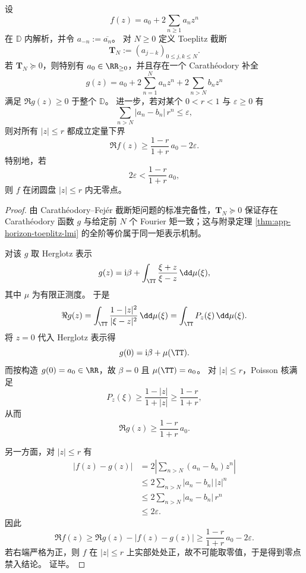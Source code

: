 \begin{theorem}\label{thm:xi-toeplitz-caratheodory-completion-tail-exclusion}
设
\[
f(z)=a_0+2\sum_{n\ge 1}a_n z^n
\]
在 \(\mathbb D\) 内解析，并令 \(a_{-n}:=\overline{a_n}\)。
对 \(N\ge 0\) 定义 Toeplitz 截断
\[
\mathbf T_N:=(a_{j-k})_{0\le j,k\le N}.
\]
若 \(\mathbf T_N\succeq 0\)，则特别有 \(a_0\in\RR_{\ge 0}\)，并且存在一个 Carath\'eodory 补全
\[
g(z)=a_0+2\sum_{n=1}^{N}a_n z^n+2\sum_{n>N}b_n z^n
\]
满足 \(\Re g(z)\ge 0\) 于整个 \(\mathbb D\)。
进一步，若对某个 \(0<r<1\) 与 \(\varepsilon\ge 0\) 有
\[
\sum_{n>N}|a_n-b_n|\,r^n\le \varepsilon,
\]
则对所有 \(|z|\le r\) 都成立定量下界
\[
\boxed{\;
\Re f(z)\ge
\frac{1-r}{1+r}\,a_0-2\varepsilon.\;}
\]
特别地，若
\[
2\varepsilon<\frac{1-r}{1+r}\,a_0,
\]
则 \(f\) 在闭圆盘 \(|z|\le r\) 内无零点。
\end{theorem}
\begin{proof}
由 Carath\'eodory--Fej\'er 截断矩问题的标准完备性，\(\mathbf T_N\succeq 0\) 保证存在 Carath\'eodory 函数 \(g\) 与给定前 \(N\) 个 Fourier 矩一致；这与附录定理 \ref{thm:app-horizon-toeplitz-lmi} 的全阶等价属于同一矩表示机制。
\par
对该 \(g\) 取 Herglotz 表示
\[
g(z)=\mathrm{i}\beta+\int_{\TT}\frac{\xi+z}{\xi-z}\,\dd\mu(\xi),
\]
其中 \(\mu\) 为有限正测度。
于是
\[
\Re g(z)=\int_{\TT}\frac{1-|z|^2}{|\xi-z|^2}\,\dd\mu(\xi)
=\int_{\TT}P_z(\xi)\,\dd\mu(\xi).
\]
将 \(z=0\) 代入 Herglotz 表示得
\[
g(0)=\mathrm{i}\beta+\mu(\TT).
\]
而按构造 \(g(0)=a_0\in\RR\)，故 \(\beta=0\) 且 \(\mu(\TT)=a_0\)。
对 \(|z|\le r\)，Poisson 核满足
\[
P_z(\xi)\ge \frac{1-|z|}{1+|z|}\ge \frac{1-r}{1+r},
\]
从而
\[
\Re g(z)\ge \frac{1-r}{1+r}\,a_0.
\]
\par
另一方面，对 \(|z|\le r\) 有
\[
\begin{aligned}
|f(z)-g(z)|
&=
2\left|
\sum_{n>N}(a_n-b_n)z^n
\right|\\
&\le
2\sum_{n>N}|a_n-b_n|\,|z|^n\\
&\le
2\sum_{n>N}|a_n-b_n|\,r^n\\
&\le 2\varepsilon.
\end{aligned}
\]
因此
\[
\Re f(z)\ge \Re g(z)-|f(z)-g(z)|
\ge
\frac{1-r}{1+r}\,a_0-2\varepsilon.
\]
若右端严格为正，则 \(f\) 在 \(|z|\le r\) 上实部处处正，故不可能取零值，于是得到零点禁入结论。
证毕。
\end{proof}

